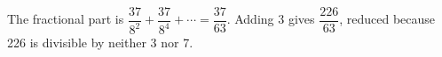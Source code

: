 The fractional part is $\dfrac{37}{8^2}+\dfrac{37}{8^4}+\cdots=\dfrac{37}{63}$. Adding 3 gives $\boxed{\dfrac{226}{63}}$, reduced because 226 is divisible by neither 3 nor 7.
